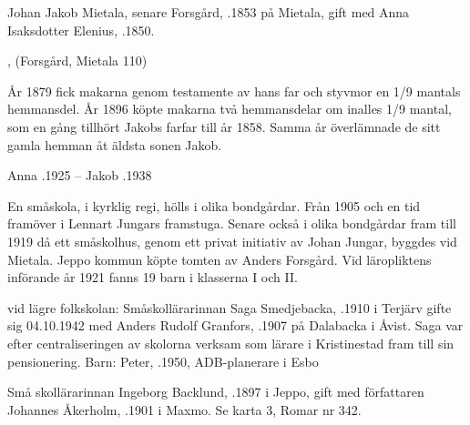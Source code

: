 Johan Jakob Mietala, senare Forsgård, .1853 på Mietala, gift med Anna Isaksdotter Elenius, .1850.
\begin{jhchildren}
  \item {}
  \item {}
  \item {}
  \item {}
  \item {}
  \item {}
  \item {}, (Forsgård, Mietala 110)
\end{jhchildren}
År 1879 fick makarna genom testamente av hans far och styvmor en 1/9 mantals hemmansdel. År 1896 köpte makarna två hemmansdelar om inalles 1/9 mantal, som en gång tillhört Jakobs farfar till år 1858. Samma år överlämnade de sitt gamla hemman åt äldsta sonen Jakob.

Anna .1925  --  Jakob .1938




En småskola, i kyrklig regi, hölls i olika bondgårdar. Från 1905 och en tid framöver i Lennart Jungars framstuga. Senare också i olika bondgårdar fram till 1919 då ett småskolhus, genom ett privat initiativ av Johan Jungar, byggdes vid Mietala. Jeppo kommun köpte tomten av Anders Forsgård. Vid läropliktens införande år 1921 fanns 19 barn i klasserna I och II.


 vid lägre folkskolan:
Småskollärarinnan Saga Smedjebacka, .1910 i Terjärv gifte sig 04.10.1942 med Anders Rudolf Granfors, .1907 på Dalabacka i Åvist. Saga var efter centraliseringen av skolorna verksam som lärare i Kristinestad fram till sin pensionering.
Barn: Peter, .1950, ADB-planerare i Esbo


Små skollärarinnan Ingeborg Backlund, .1897 i Jeppo, gift med författaren Johannes Åkerholm, .1901 i Maxmo. Se karta 3, Romar nr 342.
\begin{jhchildren}
  \item {}
  \item {}
  \item {}
\end{jhchildren}


